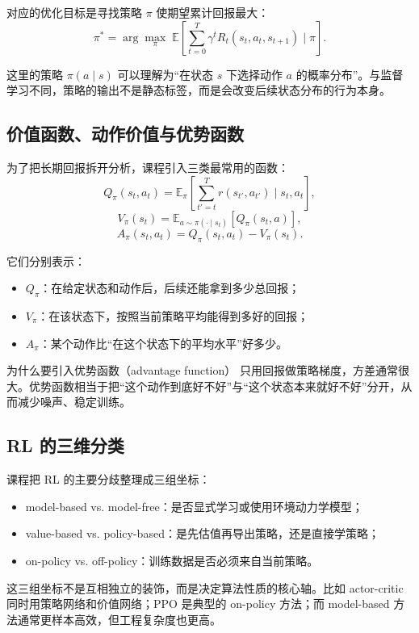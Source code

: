 \documentclass[a4paper]{article}
\begin{document}
对应的优化目标是寻找策略 \(\pi\) 使期望累计回报最大：
\[
\pi^*=\arg\max_{\pi}\;\mathbb{E}\!\left[\sum_{t=0}^{T}\gamma^t R_t(s_t,a_t,s_{t+1})\mid \pi\right].
\]

这里的策略 \(\pi(a\mid s)\) 可以理解为“在状态 \(s\) 下选择动作 \(a\) 的概率分布”。与监督学习不同，策略的输出不是静态标签，而是会改变后续状态分布的行为本身。

\subsection{价值函数、动作价值与优势函数}

为了把长期回报拆开分析，课程引入三类最常用的函数：
\[
Q_\pi(s_t,a_t)=\mathbb{E}_\pi\!\left[\sum_{t'=t}^{T} r(s_{t'},a_{t'})\mid s_t,a_t\right],
\]
\[
V_\pi(s_t)=\mathbb{E}_{a\sim\pi(\cdot\mid s_t)}\!\left[Q_\pi(s_t,a)\right],
\]
\[
A_\pi(s_t,a_t)=Q_\pi(s_t,a_t)-V_\pi(s_t).
\]

它们分别表示：
\begin{itemize}
  \item \(Q_\pi\)：在给定状态和动作后，后续还能拿到多少总回报；
  \item \(V_\pi\)：在该状态下，按照当前策略平均能得到多好的回报；
  \item \(A_\pi\)：某个动作比“在这个状态下的平均水平”好多少。
\end{itemize}

\begin{knowledgebox}{为什么要引入优势函数（advantage function）}
只用回报做策略梯度，方差通常很大。优势函数相当于把“这个动作到底好不好”与“这个状态本来就好不好”分开，从而减少噪声、稳定训练。
\end{knowledgebox}

\subsection{RL 的三维分类}

课程把 RL 的主要分歧整理成三组坐标：
\begin{itemize}
  \item model-based vs. model-free：是否显式学习或使用环境动力学模型；
  \item value-based vs. policy-based：是先估值再导出策略，还是直接学策略；
  \item on-policy vs. off-policy：训练数据是否必须来自当前策略。
\end{itemize}

这三组坐标不是互相独立的装饰，而是决定算法性质的核心轴。比如 actor-critic 同时用策略网络和价值网络；PPO 是典型的 on-policy 方法；而 model-based 方法通常更样本高效，但工程复杂度也更高。
\end{document}
